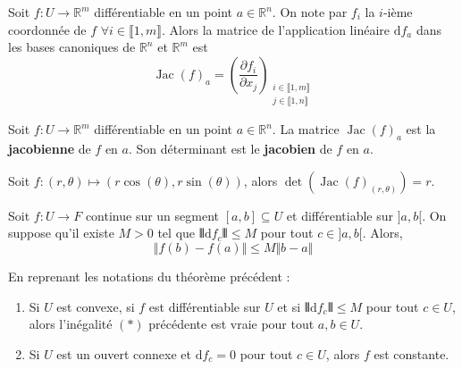 
  \begin{corollary}
    Soit $f : U \rightarrow \mathbb{R}^m$ différentiable en un point $a \in \mathbb{R}^n$. On note par $f_i$ la $i$-ième coordonnée de $f$ $\forall i \in \llbracket 1, m \rrbracket$. Alors la matrice de l'application linéaire $\mathrm{d}f_a$ dans les bases canoniques de $\mathbb{R}^n$ et $\mathbb{R}^m$ est
    \[ \operatorname{Jac}(f)_a = \left( \frac{\partial f_i}{\partial x_j} \right)_{\substack{i \in \llbracket 1, m \rrbracket \\ j \in \llbracket 1, n \rrbracket}} \]
  \end{corollary}

  \begin{definition}
    Soit $f : U \rightarrow \mathbb{R}^m$ différentiable en un point $a \in \mathbb{R}^n$. La matrice $\operatorname{Jac}(f)_a$ est la \textbf{jacobienne} de $f$ en $a$. Son déterminant est le \textbf{jacobien} de $f$ en $a$.
  \end{definition}


  \begin{example}
    Soit $f : (r,\theta) \mapsto (r\cos(\theta), r\sin(\theta))$, alors $\det(\operatorname{Jac}(f)_{(r,\theta)}) = r$.
  \end{example}


  \begin{theorem}
    Soit $f : U \rightarrow F$ continue sur un segment $[a,b] \subseteq U$ et différentiable sur $]a,b[$. On suppose qu'il existe $M > 0$ tel que $\VERT \mathrm{d}f_c \VERT \leq M$ pour tout $c \in ]a,b[$. Alors,
    \[ \Vert f(b) - f(a) \Vert \leq M \Vert b - a \Vert \tag{$*$} \]
  \end{theorem}

  \begin{corollary}
    En reprenant les notations du théorème précédent :
    \begin{enumerate}[label={\bfseries(\roman*)}]
      \item Si $U$ est convexe, si $f$ est différentiable sur $U$ et si $\VERT \mathrm{d}f_c \VERT \leq M$ pour tout $c \in U$, alors l'inégalité $(*)$ précédente est vraie pour tout $a,b \in U$.
      \item Si $U$ est un ouvert connexe et $\mathrm{d}f_c = 0$ pour tout $c \in U$, alors $f$ est constante.
    \end{enumerate}
  \end{corollary}

